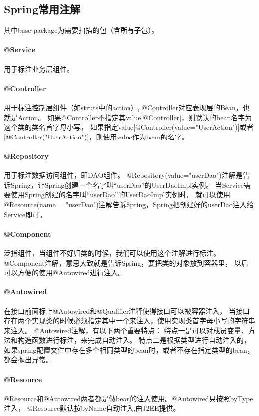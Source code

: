 \documentclass{book}
\begin{document}
\subsection{Spring常用注解}

其中base-package为需要扫描的包（含所有子包）。


\paragraph{@Service}用于标注业务层组件。

\paragraph{@Controller}用于标注控制层组件（如struts中的action）,
@Controller对应表现层的Bean，也就是Action。
如果@Controller不指定其value[@Controller]，则默认的bean名字为这个类的类名首字母小写，
如果指定value[@Controller(value="UserAction")]或者[@Controller("UserAction")]，则使用value作为bean的名字。

\paragraph{@Repository}用于标注数据访问组件，即DAO组件。
@Repository(value="userDao")注解是告诉Spring，让Spring创建一个名字叫“userDao”的UserDaoImpl实例。
当Service需要使用Spring创建的名字叫“userDao”的UserDaoImpl实例时，
就可以使用@Resource(name = "userDao")注解告诉Spring，Spring把创建好的userDao注入给Service即可。

\paragraph{@Component}泛指组件，当组件不好归类的时候，我们可以使用这个注解进行标注。
@Component注解，意思大致就是告诉Spring，要把类的对象放到容器里，
以后可以方便的使用@Autowired进行注入。

\paragraph{@Autowired}在接口前面标上@Autowired和@Qualifier注释使得接口可以被容器注入，
当接口存在两个实现类的时候必须指定其中一个来注入，使用实现类首字母小写的字符串来注入。
@Autowired注解，有以下两个重要特点：
特点一是可以对成员变量、方法和构造函数进行标注，来完成自动注入。
特点二是根据类型进行自动注入的，如果spring配置文件中存在多个相同类型的bean时，或者不存在指定类型的bean，都会抛出异常。

\paragraph{@Resource}@Resource和@Autowired两者都是做bean的注入使用。@Autowired只按照byType注入，
@Resource默认按byName自动注入,由J2EE提供。
\end{document}
